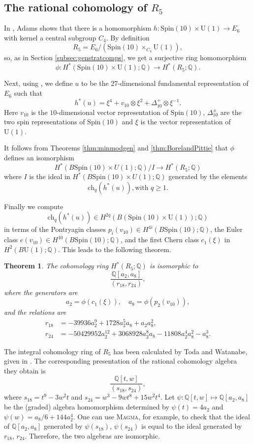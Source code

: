 \documentclass[twoside,a4paper,reqno,11pt]{amsart}
\newtheorem{theorem}[lemma]{Theorem}
\newcommand{\Q}{\mathbb{Q}}
\newcommand{\U}{\mathrm{U}}
\newcommand{\Spin}{\mathrm{Spin}}
\newcommand{\ch}{\mathrm{ch}}
\newcommand{\Magma}{\textsc{Magma}}
\begin{document}
\subsection{The rational cohomology of $R_5$}

In \cite[Chapter~8, p.51]{MR1428422}, Adams shows that there is a homomorphism $h : \Spin(10) \times \U(1) \to E_6$ with kernel a central subgroup $C_4$. By definition
\[
R_5 = E_6/(\Spin(10) \times_{C_4} \U(1)),
\]
so, as in Section \ref{subsec:genstratcomps},  we get a surjective ring homomorphism
\[
\phi : H^*(\Spin(10) \times \U(1); \Q) \to H^*(R_5; \Q).
\]

Next, using \cite[Corollary~8.3]{MR1428422},  we define $u$ to be the 27-dimensional fundamental representation of $E_6$ such that
$$
h^*(u) = \xi^4 + v_{10} \otimes \xi^2 + \Delta_{10}^+ \otimes \xi^{-1}.
$$
Here $v_{10}$ is the $10$-dimensional vector representation of $\Spin(10)$, $\Delta_{10}^{\pm}$ are the two spin representations of $\Spin(10)$ and $\xi$ is the vector representation of $\U(1)$. 

It follows from Theorems \ref{thm:minmodgen} and \ref{thm:BorelandPittie} that $\phi$ defines an isomorphism
$$
H^*(B\Spin(10)\times U(1); \Q)/ I  \to H^*(R_5; \Q)
$$
where $I$ is the ideal in $H^*(B\Spin(10)\times U(1); \Q)$ generated by the elements
$$
 \ch_q(h^*(u)), \text{with $q \geq 1$}.
$$

Finally we compute 
$$
\ch_q(h^*(u)) \in H^{2q}(B(\Spin(10) \times \U(1)); \Q)
$$ 
in terms of the Pontryagin classes $p_i(v_{10}) \in H^{4i}(B\Spin(10); \Q)$, the Euler class  $e(v_{10}) \in H^{10}(B\Spin(10); \Q)$, and the first Chern class $c_1(\xi)$ in $H^2(B\U(1); \Q)$. This leads to the following theorem.


\begin{theorem} \label{thm:presR5}
The cohomology ring $H^*(R_5; \Q)$ is isomorphic to \[ \frac{\Q[a_{2}, a_{8}]}{(r_{18},r_{24})}, \] 
where the generators are 
\[
a_2 = \phi(c_1(\xi)), \quad a_8 = \phi(p_2(v_{10})),
\]  and the relations are 
\begin{align*}
r_{18} & = -39936 a_2^9 + 1728 a_2^5 a_8 + a_2 a_8^2, \\
r_{24} & = -50429952 a_2^{12} + 3068928 a_2^8 a_8 - 11808 a_2^4 a_8^2 - a_8^3.
\end{align*}
\end{theorem}

The integral cohomology ring of $R_5$ has been calculated by Toda and Watanabe, given in \cite[Corollary~C]{MR0358847}. The corresponding presentation of the rational cohomology algebra they obtain is 
\[ \frac{\Q[t,w]}{(s_{18},s_{24})}, \]
where $s_{18} = t^9 - 3w^2t$ and $s_{24} = w^3 - 9wt^8 +15w^2t^4$. Let $\psi:\Q[t,w] \mapsto \Q[a_2, a_8]$ be the (graded) algebra homomorphism determined by $\psi(t) = 4a_2$ and $\psi(w) = a_8/6 + 144a_2^4$. One can use \Magma{}, for example, to check that the ideal of $\Q[a_2,a_8]$ generated by $\psi(s_{18})$, $\psi(s_{24})$ is equal to the ideal generated by $r_{18}$, $r_{24}$. Therefore, the two algebras are isomorphic.  
\end{document}
